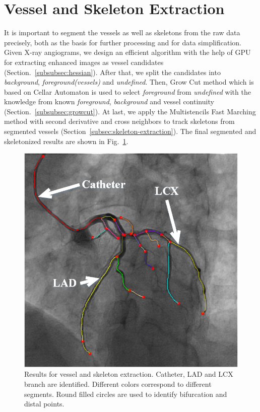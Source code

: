 \documentclass[journal]{IEEEtran}
\begin{document}
\section{Vessel and Skeleton Extraction}
\label{sec:vessel-skeleton-extraction}
It is important to segment the vessels as well as skeletons from the raw data precisely, both as the basis for further processing and for data simplification. Given X-ray angiograms, we design an efficient algorithm with the help of GPU for extracting enhanced images as vessel candidates (Section.~\ref{subsubsec:hessian}). After that, we split the candidates into \textit{background}, \textit{foreground(vessels)} and \textit{undefined}. Then, Grow Cut method which is based on Cellar Automaton is used to select \textit{foreground} from \textit{undefined} with the knowledge from known \textit{foreground}, \textit{background} and vessel continuity (Section.~\ref{subsubsec:growcut}). At last, we apply the Multistencils Fast Marching method with second derivative and cross neighbors to track skeletons from segmented vessels (Section~\ref{subsec:skeleton-extraction}). The final segmented and skeletonized results are shown in Fig.~\ref{fig:step1_result}.

\begin{figure}[!t]
\centering
\includegraphics[width=1.0\linewidth]{./images/step1_result.png}
\caption{Results for vessel and skeleton extraction. Catheter, LAD and LCX branch are identified. Different colors correspond to different segments. Round filled circles are used to identify bifurcation and distal points.}
\label{fig:step1_result}
\end{figure}
\end{document}
